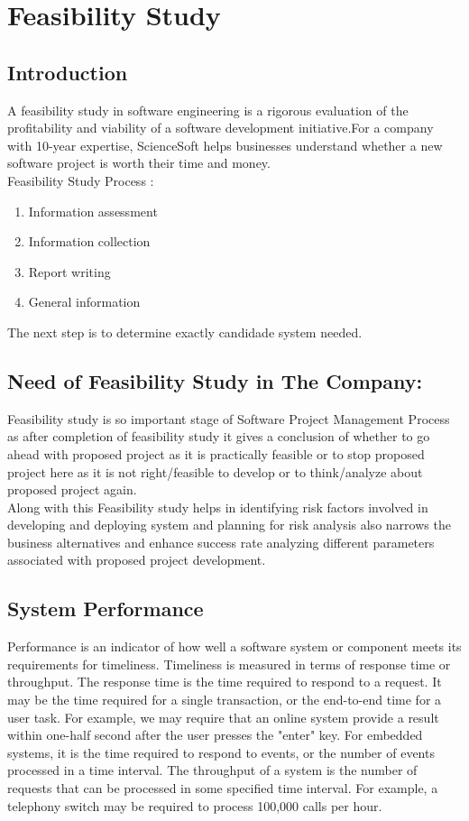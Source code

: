 \documentclass[a4paper,12pt]{report}
\begin{document}
\chapter{Feasibility Study}
\section{Introduction}
A feasibility study in software engineering is a rigorous evaluation of the profitability and viability of a software development initiative.For a  company with 10-year expertise, ScienceSoft helps businesses understand whether a new software project is worth their time and money.
\\Feasibility Study Process : \\
\begin{enumerate}
	\item	Information assessment
	\item Information collection
	\item Report writing
	\item General information
\end{enumerate}
The next step is to determine exactly candidade system needed.\\
\section{Need of Feasibility Study in The Company:} 
Feasibility study is so important stage of Software Project Management Process as after completion of feasibility study it gives a conclusion of whether to go ahead with proposed project as it is practically feasible or to stop proposed project here as it is not right/feasible to develop or to think/analyze about proposed project again.\\
Along with this Feasibility study helps in identifying risk factors involved in developing and deploying system and planning for risk analysis also narrows the business alternatives and enhance success rate analyzing different parameters associated with proposed project development.
\section{System Performance}
Performance is an indicator of how well a software system or component meets its requirements for timeliness. Timeliness is measured in terms of response time or throughput. The response time is the time required to respond to a request. It may be the time required for a single transaction, or the end-to-end time for a user task. For example, we may require that an online system provide a result within one-half second after the user presses the "enter" key. For embedded systems, it is the time required to respond to events, or the number of events processed in a time interval. The throughput of a system is the number of requests that can be processed in some specified time interval. For example, a telephony switch may be required to process 100,000 calls per hour.
\end{document}
